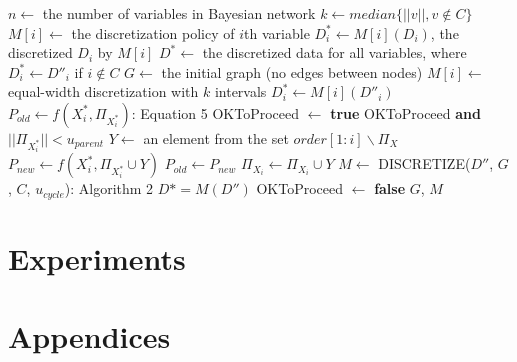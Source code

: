 {\begin{algorithm}
\begin{algorithmic}[5]
\State $n \leftarrow$ the number of variables in Bayesian network
\State $k \leftarrow median\{ ||v||, v\notin C\}$
\State $M[i] \leftarrow$ the discretization policy of $i$th variable
\State $D^*_i \leftarrow M[i] (D_i)$, the discretized $D_i$ by $M[i]$
\State $D^* \leftarrow $ the discretized data for all variables, where $D^*_i \leftarrow D''_i$ if $i \notin C$
\State $G \leftarrow$ the initial graph (no edges between nodes)
\State
{}
\State $M[i] \leftarrow$  equal-width discretization with $k$ intervals
\State $D^*_i \leftarrow  M[i] (D''_i)$
\EndIf
\EndFor
\State
{}
\State $P_{old} \leftarrow f(X^*_i,\Pi_{X^*_i})$: Equation 5
\State OKToProceed $\leftarrow$ \textbf{true}
\While OKToProceed \textbf{and} $||\Pi_{X^*_i}|| < u_{parent}$
\State $Y \leftarrow$ an element from the set $order[1:i] \backslash \Pi_X$
\State $P_{new} \leftarrow f(X^*_i,\Pi_{X^*_i} \cup Y)$
\State $P_{old} \leftarrow P_{new}$
\State $\Pi_{X_i} \leftarrow \Pi_{X_i} \cup Y $
\State $M \leftarrow$ {DISCRETIZE}({$D''$, $G$, $C$, $u_{cycle}$}): Algorithm 2
\State $D* = M(D'')$
\Else
\State OKToProceed $\leftarrow$ \textbf{false}
\EndIf
\EndWhile
\EndFor
\State \Return $G$, $M$
\EndFunction
\end{algorithmic}
\end{algorithm}


\section{Experiments}









\section*{Appendices}

}
